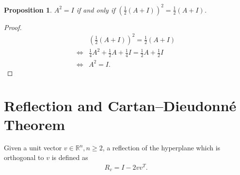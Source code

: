 \documentclass[11pt]{book}
\newtheorem{proposition}{Proposition}[chapter]
\theoremstyle{definition}
\numberwithin{equation}{chapter}
\begin{document}
\begin{subappendices}
\medskip

\begin{proposition}
$A^2 = I$ if and only if $\left(\frac{1}{2} (A + I) \right)^2 = \frac{1}{2} (A + I)$.
\end{proposition}
\begin{proof}
\begin{align*}
    & \left(\frac{1}{2} (A + I) \right)^2 = \frac{1}{2}(A + I) \\
    \Longleftrightarrow & \frac{1}{4} A^2 + \frac{1}{2} A + \frac{1}{4} I = \frac{1}{2} A + \frac{1}{2} I \\
    \Longleftrightarrow & A^2 = I.
\end{align*}
\end{proof}

\medskip

\section{Reflection and Cartan–Dieudonné Theorem}\label{appendix_reflection}

Given a unit vector $v \in \mathbb{R}^n, n \geq 2$, a reflection of the hyperplane which is orthogonal to $v$ is defined as 
\begin{align*}
    R_v = I - 2 v v^T.
\end{align*}


\end{subappendices}
\end{document}
